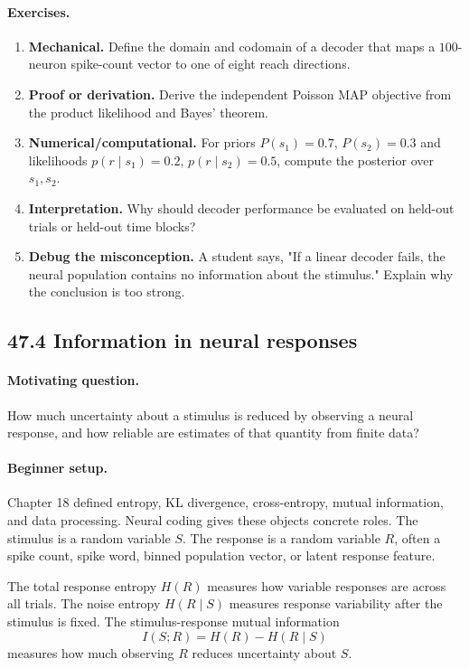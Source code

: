 \paragraph{Exercises.}
\begin{enumerate}[label=\textbf{47.3.\arabic*.}, leftmargin=*]
\item \textbf{Mechanical.} Define the domain and codomain of a decoder that maps a \(100\)-neuron spike-count vector to one of eight reach directions.
\item \textbf{Proof or derivation.} Derive the independent Poisson MAP objective from the product likelihood and Bayes' theorem.
\item \textbf{Numerical/computational.} For priors \(P(s_1)=0.7\), \(P(s_2)=0.3\) and likelihoods \(p(r\mid s_1)=0.2\), \(p(r\mid s_2)=0.5\), compute the posterior over \(s_1,s_2\).
\item \textbf{Interpretation.} Why should decoder performance be evaluated on held-out trials or held-out time blocks?
\item \textbf{Debug the misconception.} A student says, "If a linear decoder fails, the neural population contains no information about the stimulus." Explain why the conclusion is too strong.
\end{enumerate}

\subsection{47.4 Information in neural responses}

\paragraph{Motivating question.}
How much uncertainty about a stimulus is reduced by observing a neural response, and how reliable are estimates of that quantity from finite data?

\paragraph{Beginner setup.}
Chapter 18 defined entropy, KL divergence, cross-entropy, mutual information, and data processing. Neural coding gives these objects concrete roles. The stimulus is a random variable \(S\). The response is a random variable \(R\), often a spike count, spike word, binned population vector, or latent response feature.

The total response entropy \(H(R)\) measures how variable responses are across all trials. The noise entropy \(H(R\mid S)\) measures response variability after the stimulus is fixed. The stimulus-response mutual information
\[
I(S;R)=H(R)-H(R\mid S)
\]
measures how much observing \(R\) reduces uncertainty about \(S\).

